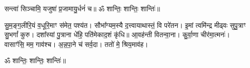 
सन्त्वा॑ सिञ्चामि॒ यजुषा॑ प्र॒जामायु॒र्धनं॑ च॥ ॐ शान्तिः॒ शान्तिः॒ शान्तिः॑॥

सु॒म॒ङ्ग॒लीरि॒यं व॒धूरि॒माꣳ स॑मेत॒ पश्य॑त। 
सौभा᳚ग्यम॒स्यै द॒त्त्वायाथास्तं॒ वि परे॑तन। 
इ॒मां त्वमि॑न्द्र मीढ्वः सुपु॒त्राꣳ सु॒भगां᳚ कुरु। 
दशा᳚स्यां पु॒त्राना धे॑हि॒ पति॑मेकाद॒शं कृ॑धि॥ आ॒वह॑न्ती वितन्वा॒ना। 
कु॒र्वा॒णा चीर॑मा॒त्मनः॑। 
वासाꣳ॑सि॒ मम॒ गाव॑श्च। 
अ॒न्न॒पा॒ने च॑ सर्व॒दा। 
ततो॑ मे॒ श्रिय॒माव॑ह।

ॐ शान्तिः॒ शान्तिः॒ शान्तिः॑॥


